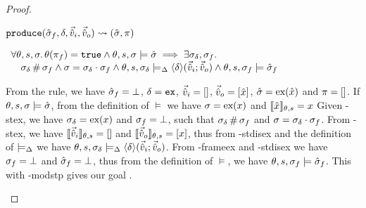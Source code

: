 \begin{proof}

\pfassume \begin{hypvlist}
 $\texttt{produce}(\hat{\sigma}_f,\delta,\vec{\hat{v}}_i,\vec{\hat{v}}_o)\rightsquigarrow (\hat{\sigma}, \pi)$
\end{hypvlist}
\pfprove \begin{goalvlist}
 $\begin{array}{l}
\forall\theta,s,\sigma\ldotp \theta(\pi_f)=\texttt{true} \land \theta,s,\sigma\models\hat{\sigma} \implies \exists \sigma_\delta, \sigma_f\ldotp \\
\quad \sigma_\delta\operatorname{\#}\sigma_f \land \sigma=\sigma_\delta\cdot\sigma_f \land \theta,s,\sigma_\delta \models_{\Delta} \left<\delta\right>\!(\vec{\hat{v}}_i;\vec{\hat{v}}_o) \land \theta,s,\sigma_f \models \hat{\sigma}_f
\end{array}$
\end{goalvlist}
\begin{hypvlist}
 From the \produce{} rule, we have $\hat{\sigma}_f=\bot$, $\delta=\texttt{ex}$, $\vec{\hat{v}}_i=[]$, $\vec{\hat{v}}_o=[\hat{x}]$, $\hat{\sigma}=\text{ex}(\hat{x})$ and $\pi=[]$.
 If $\theta,s,\sigma\models\hat{\sigma}$, from the definition of $\models$ we have $\sigma=\text{ex}(x)$ and $\llbracket\hat{x}\rrbracket_{\theta,s}=x$
 Given \hyp{stex}, we have $\sigma_\delta=\text{ex}(x)$ and $\sigma_f=\bot$, such that $\sigma_\delta\operatorname{\#}\sigma_f$ and $\sigma=\sigma_\delta\cdot\sigma_f$.
 From \hyp{stex}, we have $\llbracket\vec{\hat{v}}_i\rrbracket_{\theta,s}=[]$ and $\llbracket\vec{\hat{v}}_o\rrbracket_{\theta,s}=[x]$, thus from \hyp{stdisex} and the definition of $\models_{\Delta}$ we have $\theta,s,\sigma_\delta\models_{\Delta}\left<\delta\right>\!(\vec{\hat{v}}_i;\vec{\hat{v}}_o)$.
 From \hyp{frameex} and \hyp{stdisex} we have $\sigma_f=\bot$ and $\hat{\sigma}_f=\bot$, thus from the definition of $\models$, we have $\theta,s,\sigma_f\models\hat{\sigma}_f$. This with \hyp{modstp} gives our goal .
\end{hypvlist}



\end{proof}
